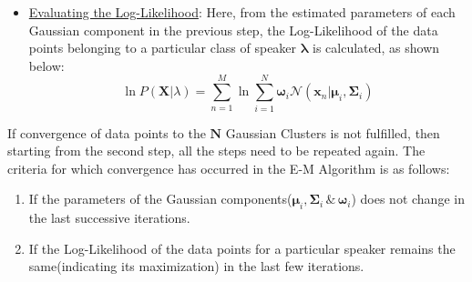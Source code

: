 \documentclass{article}
\begin{document}
\begin{itemize}
\begin{enumerate}
\begin{equation}
\bm\omega_i = \frac{1}{\bm M}\sum\limits_{n=1}^M\bm\gamma_i(\bm x_n)
\end{equation}
\end{enumerate}
\item \underline{Evaluating the Log-Likelihood}: Here, from the estimated parameters of each Gaussian component in the previous step, the Log-Likelihood of the data points belonging to a particular class of speaker $\bm\lambda$ is calculated, as shown below:
\begin{equation}
\ln P(\bm X|\lambda) = \sum\limits_{n=1}^M\ln\sum\limits_{i=1}^N\bm\omega_i\mathcal{N}(\bm x_n|\bm \mu_i,\bm \Sigma_i)
\end{equation}
\end{itemize}
If convergence of data points to the $\bm N$ Gaussian Clusters is not fulfilled, then starting from the second step, all the steps need to be repeated again. The criteria for which convergence has occurred in the E-M Algorithm is as follows:
\begin{enumerate}
\item If the parameters of the Gaussian components($\bm\mu_i,\bm\Sigma_i \,\&\, \bm\omega_i$) does not change in the last successive iterations.
\item If the Log-Likelihood of the data points for a particular speaker remains the same(indicating its maximization) in the last few iterations.
\end{enumerate}
\end{document}
